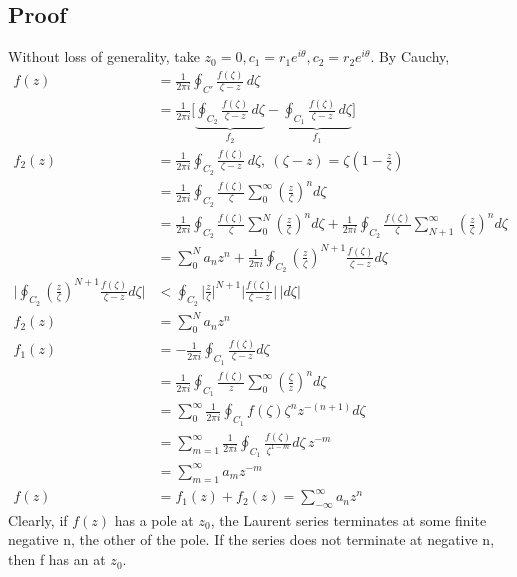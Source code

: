 \documentclass[a4paper, 11pt, normalem]{report}
\begin{document}
\subsection{Proof}
Without loss of generality, take $z_0 = 0, c_1 = r_1e^{i\theta}, c_2 = r_2e^{i\theta}$.
By Cauchy,
\begin{align}
    f(z) &= \frac{1}{2\pi i}\oint_{C'} \frac{f(\zeta)}{\zeta - z}\,d\zeta \\
         &= \frac{1}{2\pi i}\Bigg[\underbrace{\oint_{C_2} \frac{f(\zeta)}{\zeta - z}\,d\zeta}_{f_2} - \underbrace{\oint_{C_1} \frac{f(\zeta)}{\zeta-z}\,d\zeta}_{f_1}\Bigg] \\
    f_2(z) &= \frac{1}{2\pi i}\oint_{C_2} \frac{f(\zeta)}{\zeta-z}\,d\zeta,~ (\zeta - z) = \zeta\left(1 - \frac{z}{\zeta}\right) \\
           &= \frac{1}{2\pi i}\oint_{C_2} \frac{f(\zeta)}{\zeta} \sum_0^\infty \left(\frac{z}{\zeta}\right)^n d\zeta \\
           &= \frac{1}{2\pi i}\oint_{C_2} \frac{f(\zeta)}{\zeta} \sum_0^N \left(\frac{z}{\zeta}\right)^nd\zeta + \frac{1}{2\pi i}\oint_{C_2} \frac{f(\zeta)}{\zeta} \sum_{N+1}^\infty \left(\frac{z}{\zeta}\right)^n d\zeta \\
           &= \sum_0^N a_nz^n + \frac{1}{2\pi i} \oint_{C_2}\left(\frac{z}{\zeta}\right)^{N+1} \frac{f(\zeta)}{\zeta - z} d\zeta \\
    \bigg| \oint_{C_2} \left(\frac{z}{\zeta}\right)^{N+1} \frac{f(\zeta)}{\zeta - z}d\zeta\bigg| &< \oint_{C_2} \bigg|\frac{z}{\zeta}\bigg|^{N+1} \bigg|\frac{f(\zeta)}{\zeta - z}\bigg|\,|d\zeta| \\
    f_2(z) &= \sum_0^N a_nz^n  \\
    f_1(z) &= -\frac{1}{2\pi i} \oint_{C_1} \frac{f(\zeta)}{\zeta - z}d\zeta \\
           &= \frac{1}{2\pi i}\oint_{C_1} \frac{f(\zeta)}{z} \sum_{0}^\infty \left(\frac{\zeta}{z}\right)^n d\zeta \\
           &= \sum_0^\infty \frac{1}{2\pi i} \oint_{C_1} f(\zeta) \zeta^n z^{-(n+1)} d\zeta \\
           &= \sum_{m=1}^\infty \frac{1}{2\pi i} \oint_{C_1} \frac{f(\zeta)}{\zeta^{1-m}}d\zeta\,z^{-m} \\
           &= \sum_{m=1}^\infty a_mz^{-m} \\
    f(z) &= f_1(z) + f_2(z) = \sum_{-\infty}^\infty a_nz^n
\end{align}
Clearly, if $f(z)$ has a pole at $z_0$, the Laurent series terminates at some finite negative n, the other of the pole.
If the series does not terminate at negative n, then f has an  at $z_0$.
\end{document}

